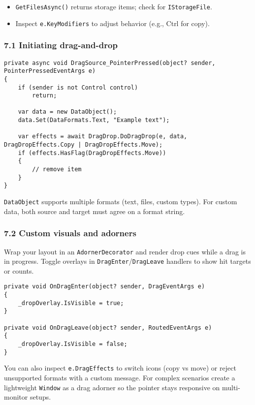 \begin{itemize}
\tightlist
\item
  \passthrough{\lstinline!GetFilesAsync()!} returns storage items; check
  for \passthrough{\lstinline!IStorageFile!}.
\item
  Inspect \passthrough{\lstinline!e.KeyModifiers!} to adjust behavior
  (e.g., Ctrl for copy).
\end{itemize}

\subsubsection{7.1 Initiating
drag-and-drop}\label{initiating-drag-and-drop}

\begin{lstlisting}
private async void DragSource_PointerPressed(object? sender, PointerPressedEventArgs e)
{
    if (sender is not Control control)
        return;

    var data = new DataObject();
    data.Set(DataFormats.Text, "Example text");

    var effects = await DragDrop.DoDragDrop(e, data, DragDropEffects.Copy | DragDropEffects.Move);
    if (effects.HasFlag(DragDropEffects.Move))
    {
        // remove item
    }
}
\end{lstlisting}

\passthrough{\lstinline!DataObject!} supports multiple formats (text,
files, custom types). For custom data, both source and target must agree
on a format string.

\subsubsection{7.2 Custom visuals and
adorners}\label{custom-visuals-and-adorners}

Wrap your layout in an \passthrough{\lstinline!AdornerDecorator!} and
render drop cues while a drag is in progress. Toggle overlays in
\passthrough{\lstinline!DragEnter!}/\passthrough{\lstinline!DragLeave!}
handlers to show hit targets or counts.

\begin{lstlisting}
private void OnDragEnter(object? sender, DragEventArgs e)
{
    _dropOverlay.IsVisible = true;
}

private void OnDragLeave(object? sender, RoutedEventArgs e)
{
    _dropOverlay.IsVisible = false;
}
\end{lstlisting}

You can also inspect \passthrough{\lstinline!e.DragEffects!} to switch
icons (copy vs move) or reject unsupported formats with a custom
message. For complex scenarios create a lightweight
\passthrough{\lstinline!Window!} as a drag adorner so the pointer stays
responsive on multi-monitor setups.


